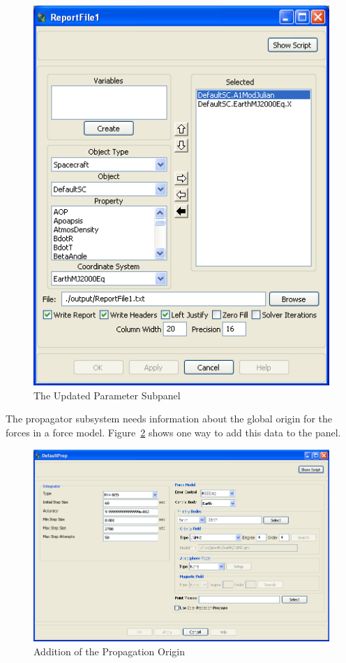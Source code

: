 \begin{figure}
\begin{center}
\includegraphics[217,278]{Images/ParameterSubpanel.png}
\caption{\label{figure:ParameterSubpanel}The Updated Parameter Subpanel}
\end{center}
\end{figure}

The propagator subsystem needs information about the global origin for the forces in a force model.
Figure~\ref{figure:PropPanelUpdate} shows one way to add this data to the panel.

\begin{figure}
\begin{center}
\includegraphics[419,271]{Images/PropPanel.png}
\caption{\label{figure:PropPanelUpdate}Addition of the Propagation Origin}
\end{center}
\end{figure}

